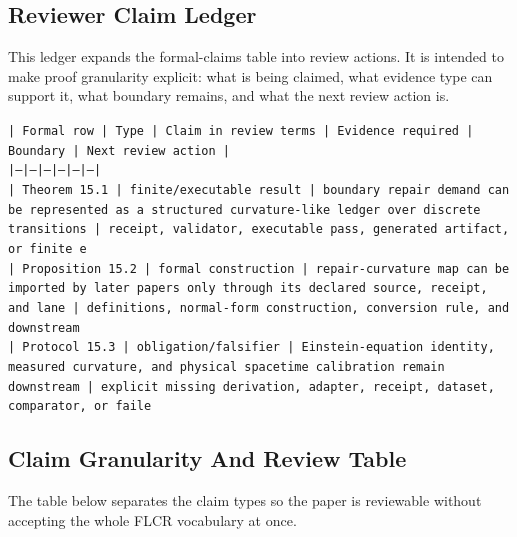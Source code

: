 \documentclass[11pt]{article}
\begin{document}
\subsection*{Reviewer Claim Ledger}

This ledger expands the formal-claims table into review actions. It is intended to make proof granularity explicit: what is being claimed, what evidence type can support it, what boundary remains, and what the next review action is.

\noindent\texttt{| Formal row | Type | Claim in review terms | Evidence required | Boundary | Next review action |}\\
\noindent\texttt{|---|---|---|---|---|---|}\\
\noindent\texttt{| Theorem 15.1 | finite/executable result | boundary repair demand can be represented as a structured curvature-like ledger over discrete transitions | receipt, validator, executable pass, generated artifact, or finite e}\\
\noindent\texttt{| Proposition 15.2 | formal construction | repair-curvature map can be imported by later papers only through its declared source, receipt, and lane | definitions, normal-form construction, conversion rule, and downstream}\\
\noindent\texttt{| Protocol 15.3 | obligation/falsifier | Einstein-equation identity, measured curvature, and physical spacetime calibration remain downstream | explicit missing derivation, adapter, receipt, dataset, comparator, or faile}\\

\subsection*{Claim Granularity And Review Table}

The table below separates the claim types so the paper is reviewable without accepting the whole FLCR vocabulary at once.
\end{document}
